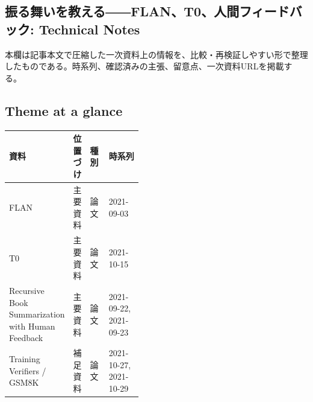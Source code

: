 \subsection*{振る舞いを教える――FLAN、T0、人間フィードバック: Technical Notes}
本欄は記事本文で圧縮した一次資料上の情報を、比較・再検証しやすい形で整理したものである。時系列、確認済みの主張、留意点、一次資料URLを掲載する。
\smallskip
{}\par
\medskip
\subsection*{Theme at a glance}
\begin{center}
\footnotesize
\begin{tabularx}{\linewidth}{@{}p{0.20\linewidth}p{0.10\linewidth}p{0.14\linewidth}X@{}}
\toprule
資料 & 位置づけ & 種別 & 時系列 \\
\midrule
FLAN & 主要資料 & 論文 & 2021-09-03 \\
T0 & 主要資料 & 論文 & 2021-10-15 \\
Recursive Book Summarization with Human Feedback & 主要資料 & 論文 & 2021-09-22, 2021-09-23 \\
Training Verifiers / GSM8K & 補足資料 & 論文 & 2021-10-27, 2021-10-29 \\
\bottomrule
\end{tabularx}
\end{center}
\normalsize

